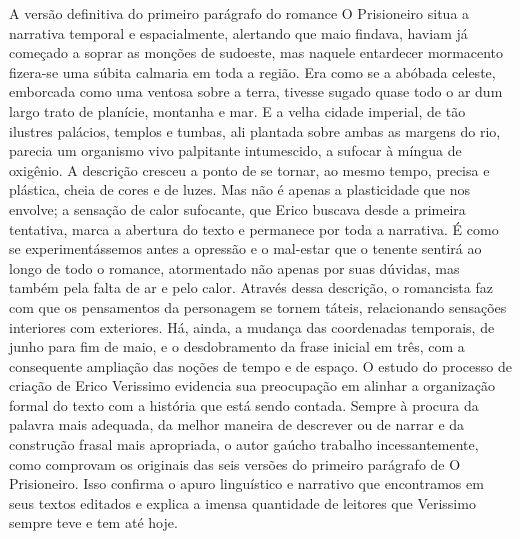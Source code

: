A versão definitiva do primeiro parágrafo do romance  O Prisioneiro situa a narrativa temporal e espacialmente, alertando que maio findava, haviam já começado a soprar as monções de sudoeste, mas naquele entardecer mormacento fizera-se uma súbita calmaria em toda a região. Era como se a abóbada celeste, emborcada como uma ventosa sobre a terra, tivesse sugado quase todo o ar dum largo trato de planície, montanha e mar. E a velha cidade imperial, de tão ilustres palácios, templos e tumbas, ali plantada sobre ambas as margens do rio, parecia um organismo vivo palpitante intumescido, a sufocar à míngua de oxigênio. A descrição cresceu a ponto de se tornar, ao mesmo tempo, precisa e plástica, cheia de cores e de luzes.
Mas não é apenas a plasticidade que nos envolve; a sensação de calor sufocante, que Erico buscava desde a primeira tentativa, marca a abertura do texto e permanece por toda a narrativa. É como se experimentássemos antes a opressão e o mal-estar que o tenente sentirá ao longo de todo o romance, atormentado não apenas por suas dúvidas, mas também pela falta de ar e pelo calor.
Através dessa descrição, o romancista faz com que os pensamentos da personagem se tornem táteis, relacionando sensações interiores com exteriores. Há, ainda, a mudança das coordenadas temporais, de junho para fim de maio, e o desdobramento da frase inicial em três, com a consequente ampliação das noções de tempo e de espaço.
O estudo do processo de criação de Erico Verissimo evidencia sua preocupação em alinhar a organização formal do texto com a história que está sendo contada. Sempre à procura da palavra mais adequada, da melhor maneira de descrever ou de narrar e da construção frasal mais apropriada, o autor gaúcho trabalho incessantemente, como comprovam os originais das seis versões do primeiro parágrafo de  O Prisioneiro. Isso confirma o apuro linguístico e narrativo que encontramos em seus textos editados e explica a imensa quantidade de leitores que Verissimo sempre teve e tem até hoje.

